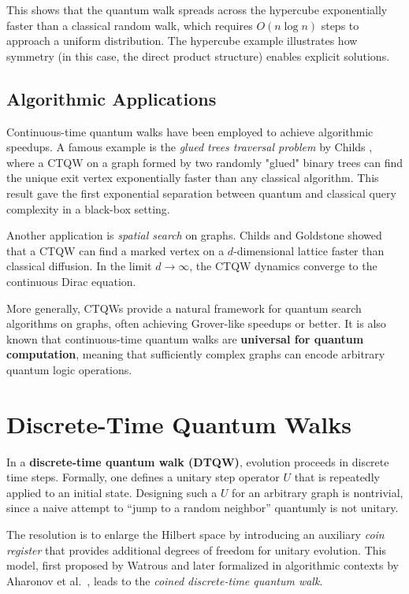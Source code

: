 \documentclass[12pt]{report}
\begin{document}
This shows that the quantum walk spreads across the hypercube exponentially faster than a classical random walk, which requires $O(n \log n)$ steps to approach a uniform distribution. The hypercube example illustrates how symmetry (in this case, the direct product structure) enables explicit solutions.

\subsection{Algorithmic Applications}

Continuous-time quantum walks have been employed to achieve algorithmic speedups. A famous example is the \emph{glued trees traversal problem} by Childs \cite{Childs2003}, where a CTQW on a graph formed by two randomly "glued" binary trees can find the unique exit vertex exponentially faster than any classical algorithm. This result gave the first exponential separation between quantum and classical query complexity in a black-box setting.

Another application is \emph{spatial search} on graphs. Childs and Goldstone \cite{ChildsGoldstone2004} showed that a CTQW can find a marked vertex on a $d$-dimensional lattice faster than classical diffusion. In the limit $d \to \infty$, the CTQW dynamics converge to the continuous Dirac equation.

More generally, CTQWs provide a natural framework for quantum search algorithms on graphs, often achieving Grover-like speedups or better. It is also known that continuous-time quantum walks are \textbf{universal for quantum computation}, meaning that sufficiently complex graphs can encode arbitrary quantum logic operations.


\section{Discrete-Time Quantum Walks}

In a \textbf{discrete-time quantum walk (DTQW)}, evolution proceeds in discrete time steps. Formally, one defines a unitary step operator $U$ that is repeatedly applied to an initial state. Designing such a $U$ for an arbitrary graph is nontrivial, since a naive attempt to “jump to a random neighbor” quantumly is not unitary.

The resolution is to enlarge the Hilbert space by introducing an auxiliary \emph{coin register} that provides additional degrees of freedom for unitary evolution. This model, first proposed by Watrous \cite{Watrous2001} and later formalized in algorithmic contexts by Aharonov et al.~\cite{Aharonov2001}, leads to the \emph{coined discrete-time quantum walk}.
\end{document}
